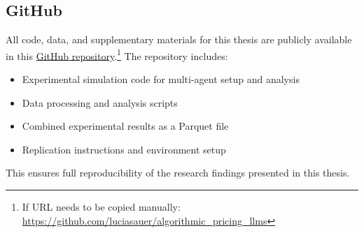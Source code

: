 \subsection*{GitHub}

All code, data, and supplementary materials for this thesis are publicly available in this \href{https://github.com/luciasauer/algorithmic_pricing_llms}{GitHub repository}.\footnote{If URL needs to be copied manually: \url{https://github.com/luciasauer/algorithmic_pricing_llms}} The repository includes:

\begin{itemize}
    \item Experimental simulation code for multi-agent setup and analysis
    \item Data processing and analysis scripts
    \item Combined experimental results as a Parquet file 
    \item Replication instructions and environment setup
\end{itemize}

This ensures full reproducibility of the research findings presented in this thesis.